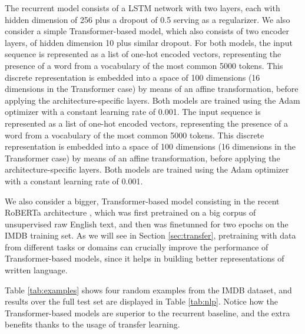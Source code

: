 The recurrent model consists of a LSTM network with two layers, each with hidden dimension of 256 plus a dropout of 0.5 serving as a regularizer. We also consider a simple Transformer-based model, which also consists of two encoder layers, of hidden dimension 10 plus similar dropout. For both models, the input sequence is represented as a list of one-hot encoded vectors, representing the presence of a word from a vocabulary of the most common 5000 tokens. This discrete representation is embedded into a space of 100 dimensions (16 dimensions in the Transformer case) by means of an affine transformation, before applying the architecture-specific layers. Both models are trained using the Adam optimizer with a constant learning rate of 0.001.
The input sequence is represented as a list of one-hot encoded vectors, representing the presence of a word from a vocabulary of the most common 5000 tokens. This discrete representation is embedded into a space of 100 dimensions (16 dimensions in the Transformer case) by means of an affine transformation, before applying the architecture-specific layers. 
Both models are trained using the Adam optimizer with a constant learning rate of 0.001.

We also consider a bigger, Transformer-based model consisting in the recent RoBERTa architecture \citep{liu2019roberta}, which was first pretrained on a big corpus of unsupervised raw  English text, and then was finetunned for two epochs on the IMDB training set. As we will see in Section \ref{sec:transfer}, pretraining with data from different tasks or domains can crucially improve the performance of Transformer-based models, since it helps in building better representations of written language.

Table \ref{tab:examples} shows four random examples from the IMDB dataset, and results over the full test set are displayed in Table \ref{tab:nlp}. Notice how the Transformer-based models are superior to the recurrent baseline, and the extra benefits thanks to the usage of transfer learning.


